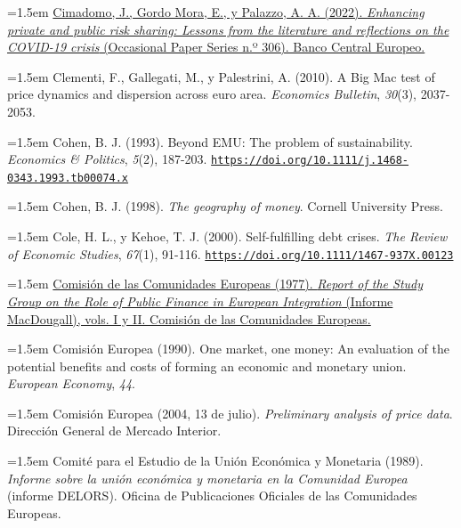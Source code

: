 \documentclass[10pt,a4paper]{article}
\begin{document}
\noindent\hangindent=1.5em \href{https://www.ecb.europa.eu/pub/pdf/scpops/ecb.op306~c71abf2194.en.pdf}{Cimadomo, J., Gordo Mora, E., y Palazzo, A. A. (2022). \textit{Enhancing private and public risk sharing: Lessons from the literature and reflections on the COVID-19 crisis} (Occasional Paper Series n.º 306). Banco Central Europeo.}

\noindent\hangindent=1.5em Clementi, F., Gallegati, M., y Palestrini, A. (2010). A Big Mac test of price dynamics and dispersion across euro area. \textit{Economics Bulletin}, \textit{30}(3), 2037-2053.

\noindent\hangindent=1.5em Cohen, B. J. (1993). Beyond EMU: The problem of sustainability. \textit{Economics \& Politics}, \textit{5}(2), 187-203. \href{https://doi.org/10.1111/j.1468-0343.1993.tb00074.x}{\nolinkurl{https://doi.org/10.1111/j.1468-0343.1993.tb00074.x}}

\noindent\hangindent=1.5em Cohen, B. J. (1998). \textit{The geography of money}. Cornell University Press.

\noindent\hangindent=1.5em Cole, H. L., y Kehoe, T. J. (2000). Self-fulfilling debt crises. \textit{The Review of Economic Studies}, \textit{67}(1), 91-116. \href{https://doi.org/10.1111/1467-937X.00123}{\nolinkurl{https://doi.org/10.1111/1467-937X.00123}}

\noindent\hangindent=1.5em \href{https://www.cvce.eu/obj/the_macdougall_report_volume_i_brussels_april_1977-en-c475e949-ed28-490b-81ae-a33ce9860d09.html}{Comisión de las Comunidades Europeas (1977). \textit{Report of the Study Group on the Role of Public Finance in European Integration} (Informe MacDougall), vols. I y II. Comisión de las Comunidades Europeas.}

\noindent\hangindent=1.5em Comisión Europea (1990). One market, one money: An evaluation of the potential benefits and costs of forming an economic and monetary union. \textit{European Economy}, \textit{44}.

\noindent\hangindent=1.5em Comisión Europea (2004, 13 de julio). \textit{Preliminary analysis of price data}. Dirección General de Mercado Interior.

\noindent\hangindent=1.5em Comité para el Estudio de la Unión Económica y Monetaria (1989). \textit{Informe sobre la unión económica y monetaria en la Comunidad Europea} (informe DELORS). Oficina de Publicaciones Oficiales de las Comunidades Europeas.
\end{document}
